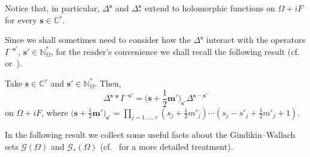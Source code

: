 \documentclass[10.5pt,reqno]{amsart}
\newcommand{\vect}[1]{\mathbf{{#1}}}
\newcommand{\N}{\mathds{N}}
\newcommand{\C}{\mathds{C}}
\newcommand{\Gc}{\mathcal{G}}
\begin{document}
Notice that, in particular,  $\Delta^{\vect s}$ and $\Delta^{\vect s}_*$ extend to holomorphic functions on $\Omega+ i F$ for every $\vect s\in \C^r$.



Since we shall sometimes need to consider how the $\Delta^{\vect s}$ interact with the operators $I^{-\vect s'}$, $\vect s'\in \N_{\Omega}^*$, for the  reader's convenience we shall recall the following result (cf.~\cite[Proposition VII.1.6]{FarautKoranyi} or~\cite[Proposition 2.29]{CalziPeloso}).

\begin{lem}\label{lem:8}
Take $\vect s\in \C^r$ and $\vect s'\in \N_{\Omega}^*$. Then,
\[
\Delta^{\vect s}*I^{-\vect s'}= \Big(\vect s+\frac 1 2 \vect m'\Big)_{\vect s'} \Delta^{\vect s-\vect s'}
\]
on $\Omega+ i F$, where $ \big(\vect s+\frac 1 2 \vect m'\big)_{\vect s'}=\prod_{j=1,\dots, r}(s_j+\frac 1 2 m'_j)\cdots  (s_j-s'_j+\frac 1 2 m'_j+1)$.
\end{lem}

In the following result we collect some useful facts about the Gindikin--Wallach sets $\Gc(\Omega)$ and $\Gc_*(\Omega)$ (cf.~\cite{Ishi} for a more detailed treatment).
\end{document}
